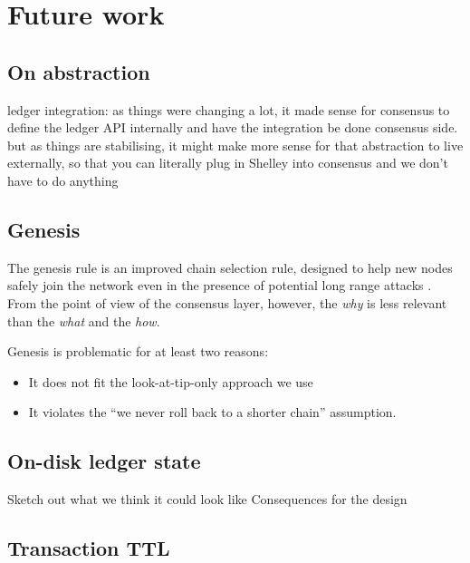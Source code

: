 \chapter{Future work}

\section{On abstraction}

ledger integration: as things were changing a lot, it made sense for consensus to define the ledger API internally and have the integration be done consensus side. but as things are stabilising, it might make more sense for that abstraction to live externally, so that you can literally plug in Shelley into consensus and we don't have to do anything

\section{Genesis}
\label{future:genesis}

The genesis rule is an improved chain selection rule, designed to help new nodes
safely join the network even in the presence of potential long range attacks
\cite{cryptoeprint:2018:378}. From the point of view of the consensus layer,
however, the \emph{why} is less relevant than the \emph{what} and the
\emph{how}.



Genesis is problematic for at least two reasons:

\begin{itemize}
\item It does not fit the look-at-tip-only approach we use
\item It violates the ``we never roll back to a shorter chain'' assumption.
\end{itemize}




\section{On-disk ledger state}

\duncan

Sketch out what we think it could look like
Consequences for the design

\section{Transaction TTL}
\label{future:ttl}

